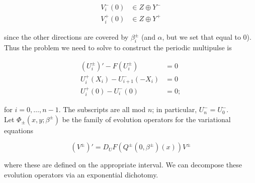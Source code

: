 \documentclass[12pt]{article}
\begin{document}
\begin{align*}
V_i^-(0) &\in Z \oplus Y^- \\
V_i^+(0) &\in Z \oplus Y^+
\end{align*}

since the other directions are covered by $\beta_i^\pm$ (and $\alpha$, but we set that equal to 0).\\

Thus the problem we need to solve to construct the periodic multipulse is

\begin{align}
(U_i^\pm)' - F(U_i^\pm) &= 0 \\
U_i^+(X_i) - U_{i+1}^-(-X_i) &= 0 \\
U_i^+(0) - U_i^-(0) &= 0;
\end{align}

for $i = 0, \dots, {n-1}$. The subscripts are all mod $n$; in particular, $U_n^- = U_0^-$.\\

Let $\Phi_\pm(x, y; \beta^\pm)$ be the family of evolution operators for the variational equations

\begin{equation}
(V^\pm)' = D_U F(Q^\pm(0, \beta^\pm)(x)) V^\pm
\end{equation}

where these are defined on the appropriate interval. We can decompose these evolution operators via an exponential dichotomy.
\end{document}
